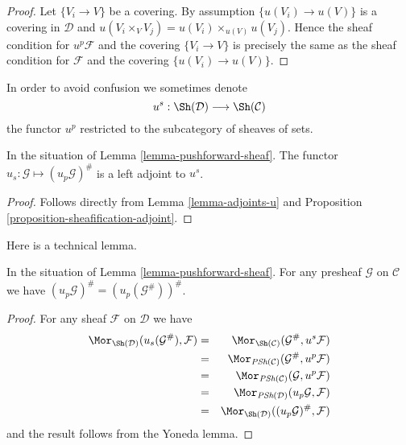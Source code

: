 \begin{proof}
Let $\{V_i \to V\}$ be a covering.
By assumption $\{u(V_i) \to u(V)\}$ is a covering
in $\mathcal{D}$ and $u(V_i \times_V V_j) =
u(V_i)\times_{u(V)}u(V_j)$. Hence the sheaf condition for
$u^p\mathcal{F}$ and the covering $\{V_i \to V\}$
is precisely the same as the sheaf condition for $\mathcal{F}$
and the covering $\{u(V_i) \to u(V)\}$.
\end{proof}

\noindent
In order to avoid confusion we sometimes denote
$$
u^s :
\Sh(\mathcal{D})
\longrightarrow
\Sh(\mathcal{C})
$$
the functor $u^p$ restricted to the subcategory of sheaves of sets.

\begin{lemma}
\label{lemma-adjoint-sheaves}
In the situation of Lemma \ref{lemma-pushforward-sheaf}.
The functor $u_s : \mathcal{G} \mapsto (u_p \mathcal{G})^\#$
is a left adjoint to $u^s$.
\end{lemma}

\begin{proof}
Follows directly from Lemma \ref{lemma-adjoints-u} and
Proposition \ref{proposition-sheafification-adjoint}.
\end{proof}

\noindent
Here is a technical lemma.

\begin{lemma}
\label{lemma-technical-up}
In the situation of Lemma \ref{lemma-pushforward-sheaf}.
For any presheaf $\mathcal{G}$ on $\mathcal{C}$
we have $(u_p\mathcal{G})^\# = (u_p(\mathcal{G}^\#))^\#$.
\end{lemma}

\begin{proof}
For any sheaf $\mathcal{F}$ on $\mathcal{D}$ we have
\begin{eqnarray*}
\Mor_{\Sh(\mathcal{D})}(u_s(\mathcal{G}^\#), \mathcal{F})
& = &
\Mor_{\Sh(\mathcal{C})}(\mathcal{G}^\#, u^s\mathcal{F}) \\
& = &
\Mor_{\textit{PSh}(\mathcal{C})}(\mathcal{G}^\#, u^p\mathcal{F}) \\
& = &
\Mor_{\textit{PSh}(\mathcal{C})}(\mathcal{G}, u^p\mathcal{F}) \\
& = &
\Mor_{\textit{PSh}(\mathcal{D})}(u_p\mathcal{G}, \mathcal{F}) \\
& = &
\Mor_{\Sh(\mathcal{D})}((u_p\mathcal{G})^\#, \mathcal{F})
\end{eqnarray*}
and the result follows from the Yoneda lemma.
\end{proof}

